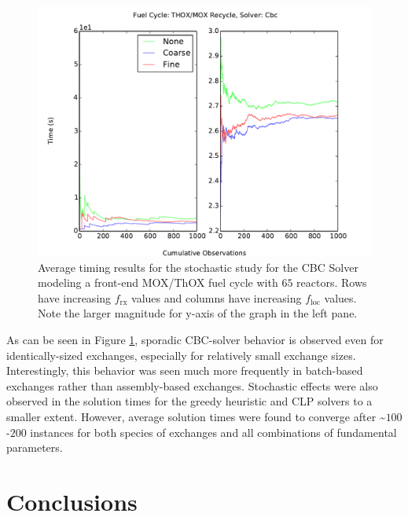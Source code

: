 \documentclass{anstrans}
\newcommand{\frx}{$f_{\text{rx}}$\xspace}
\newcommand{\floc}{$f_{\text{loc}}$\xspace}
\begin{document}
\begin{figure}
  \begin{center}
    \includegraphics[width=1.2\columnwidth]{1k_avg_front_time_fc2_cbc.pdf}
    \caption[]{
      \label{fig:cbc_stochastic}
      Average timing results for the stochastic study for the CBC Solver
      modeling a front-end MOX/ThOX fuel cycle with $65$ reactors. Rows have
      increasing \frx values and columns have increasing \floc values. Note the
      larger magnitude for y-axis of the graph in the left pane. }
  \end{center}
\end{figure}

As can be seen in Figure \ref{fig:cbc_stochastic}, sporadic CBC-solver behavior
is observed even for identically-sized exchanges, especially for relatively
small exchange sizes. Interestingly, this behavior was seen much more frequently
in batch-based exchanges rather than assembly-based exchanges. Stochastic
effects were also observed in the solution times for the greedy heuristic and
CLP solvers to a smaller extent. However, average solution times were found to
converge after \textasciitilde$100$-$200$ instances for both species of
exchanges and all combinations of fundamental parameters.


\section{Conclusions}
\end{document}

